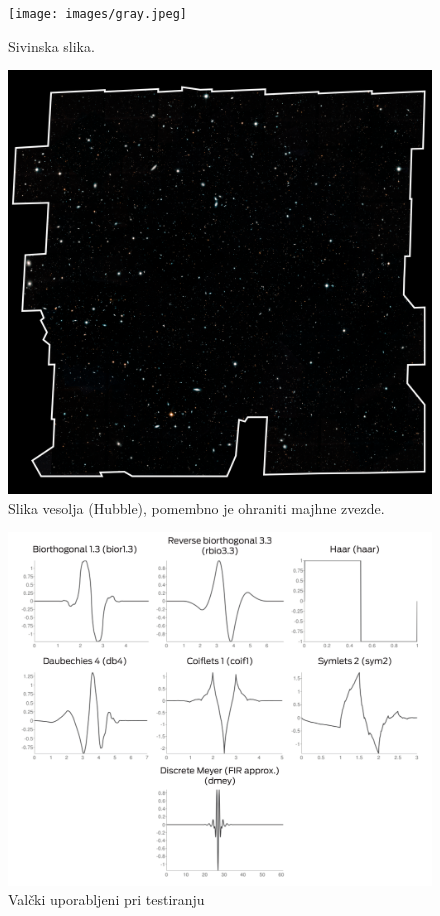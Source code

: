 \documentclass[a4paper,11pt]{article}
\begin{document}
\begin{figure}[htbp]
\begin{center}
\texttt{[image: images/gray.jpeg]}
\caption{Sivinska slika.}
\label{slika3}
\end{center}
\end{figure}

\begin{figure}[htbp]
\begin{center}
\includegraphics[width=1\textwidth]{images/hubble2000x2000.png}
\caption{Slika vesolja (Hubble), pomembno je ohraniti majhne zvezde.}
\label{slika4}
\end{center}
\end{figure}


\begin{figure}[htbp]
\begin{center}
\includegraphics[width=1\textwidth]{images/report/wavelets.pdf}
\caption{Valčki uporabljeni pri testiranju}
\label{wavelets}
\end{center}
\end{figure}
\end{document}
